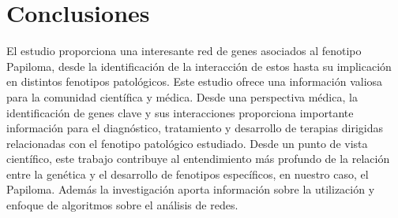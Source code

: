 \section{Conclusiones}
El estudio proporciona una interesante red de genes asociados al fenotipo Papiloma, desde la identificación de la interacción de estos hasta su implicación en distintos fenotipos patológicos. Este estudio ofrece una información valiosa para la comunidad científica y médica. Desde una perspectiva médica, la identificación de genes clave y sus interacciones proporciona importante información para el diagnóstico, tratamiento y desarrollo de terapias dirigidas relacionadas con el fenotipo patológico estudiado. Desde un punto de vista científico, este trabajo contribuye al entendimiento más profundo de la relación entre la genética y el desarrollo de fenotipos específicos, en nuestro caso, el Papiloma. Además la investigación aporta información sobre la utilización y enfoque de algoritmos sobre el análisis de redes.
